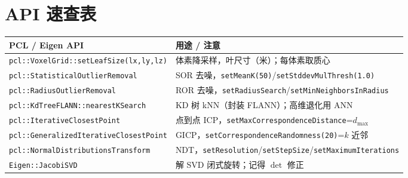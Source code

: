 \section*{API 速查表}
\begin{table}[H]\centering\small
\begin{tabular}{p{} p{}}
\toprule
PCL / Eigen API & 用途 / 注意 \\
\midrule
\texttt{pcl::VoxelGrid::setLeafSize(lx,ly,lz)} & 体素降采样，叶尺寸（米）；每体素取质心 \\
\texttt{pcl::StatisticalOutlierRemoval} & SOR 去噪，\texttt{setMeanK(50)}/\allowbreak\texttt{setStddevMulThresh(1.0)} \\
\texttt{pcl::RadiusOutlierRemoval} & ROR 去噪，\texttt{setRadiusSearch}/\allowbreak\texttt{setMinNeighborsInRadius} \\
\texttt{pcl::KdTreeFLANN::nearestKSearch} & KD 树 kNN（封装 FLANN）；高维退化用 ANN \\
\texttt{pcl::IterativeClosestPoint} & 点到点 ICP，\texttt{setMaxCorrespondenceDistance}=$d_{\max}$ \\
\texttt{pcl::GeneralizedIterativeClosestPoint} & GICP，\texttt{setCorrespondenceRandomness(20)}=$k$ 近邻 \\
\texttt{pcl::NormalDistributionsTransform} & NDT，\texttt{setResolution}/\allowbreak\texttt{setStepSize}/\allowbreak\texttt{setMaximumIterations} \\
\texttt{Eigen::JacobiSVD} & 解 SVD 闭式旋转；记得 $\det$ 修正 \\
\bottomrule
\end{tabular}
\end{table}
